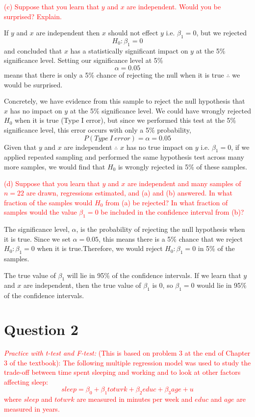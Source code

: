 \documentclass[12pt]{report}
\begin{document}
\noindent \textcolor{red}{(c) Suppose that you learn that $y$ and $x$ are independent. Would you be surprised? Explain.}

\noindent If $y$ and $x$ are independent then $x$ should not effect $y$ i.e. $\beta_1 = 0$, but we rejected $$H_0: \beta_1 = 0$$ and concluded that $x$ has a statistically significant impact on $y$ at the 5\% significance level. Setting our significance level at 5\% $$\alpha=0.05$$ means that there is only a 5\% chance of rejecting the null when it is true $\therefore$ we would be surprised.

\noindent Concretely, we have evidence from this sample to reject the null hypothesis that $x$ has no impact on $y$ at the 5\% significance level. We could have wrongly rejected $H_0$ when it is true (Type I error), but since we performed this test at the 5\% significance level, this error occurs with only a 5\% probability, $$P(Type\ I\ error) = \alpha = 0.05$$ Given that $y$ and $x$ are independent $\therefore$ $x$ has no true impact on $y$ i.e. $\beta_1 = 0$, if we applied repeated sampling and performed the same hypothesis test across many more samples, we would find that $H_0$ is wrongly rejected in 5\% of these samples.

\noindent \textcolor{red}{(d) Suppose that you learn that $y$ and $x$ are independent and many samples of $n=22$ are drawn, regressions estimated, and (a) and (b) answered. In what fraction of the samples would $H_0$ from (a) be rejected? In what fraction of samples would the value $\beta_1 = 0$ be included in the confidence interval from (b)?}

\noindent The significance level, $\alpha$, is the probability of rejecting the null hypothesis when it is true. Since we set $\alpha = 0.05$, this means there is a 5\% chance that we reject $H_0: \beta_1=0$ when it is true.Therefore, we would reject $H_0: \beta_1=0$ in 5\% of the samples.

\noindent The true value of $\beta_1$ will lie in 95\% of the confidence intervals. If we learn that $y$ and $x$ are independent, then the true value of $\beta_1$ is $0$, so $\beta_1 = 0$ would lie in 95\% of the confidence intervals.

\newpage
\section*{Question 2}
\noindent \textcolor{red}{\textit{Practice with t-test and F-test:} (This is based on problem 3 at the end of Chapter 3 of the textbook): The following multiple regression model was used to study the trade-off between time spent sleeping and working and to look at other factors affecting sleep: $$sleep = \beta_0 + \beta_1 totwrk + \beta_2 educ + \beta_3 age + u$$ where $sleep$ and $totwrk$ are measured in minutes per week and $educ$ and $age$ are measured in years.}
\end{document}
